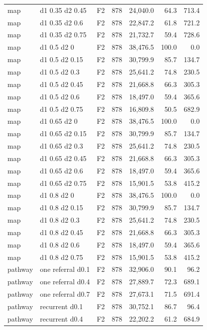 \begin{longtable}{p{1.8cm}p{3.35cm}lrrrr}
map & d1 0.35 d2 0.45 & F2 & 878 & 24,040.0 & 64.3 & 713.4\\
map & d1 0.35 d2 0.6 & F2 & 878 & 22,847.2 & 61.8 & 721.2\\
map & d1 0.35 d2 0.75 & F2 & 878 & 21,732.7 & 59.4 & 728.6\\
map & d1 0.5 d2 0 & F2 & 878 & 38,476.5 & 100.0 & 0.0\\
map & d1 0.5 d2 0.15 & F2 & 878 & 30,799.9 & 85.7 & 134.7\\
map & d1 0.5 d2 0.3 & F2 & 878 & 25,641.2 & 74.8 & 230.5\\
map & d1 0.5 d2 0.45 & F2 & 878 & 21,668.8 & 66.3 & 305.3\\
map & d1 0.5 d2 0.6 & F2 & 878 & 18,497.0 & 59.4 & 365.6\\
map & d1 0.5 d2 0.75 & F2 & 878 & 16,809.8 & 50.5 & 682.9\\
map & d1 0.65 d2 0 & F2 & 878 & 38,476.5 & 100.0 & 0.0\\
map & d1 0.65 d2 0.15 & F2 & 878 & 30,799.9 & 85.7 & 134.7\\
map & d1 0.65 d2 0.3 & F2 & 878 & 25,641.2 & 74.8 & 230.5\\
map & d1 0.65 d2 0.45 & F2 & 878 & 21,668.8 & 66.3 & 305.3\\
map & d1 0.65 d2 0.6 & F2 & 878 & 18,497.0 & 59.4 & 365.6\\
map & d1 0.65 d2 0.75 & F2 & 878 & 15,901.5 & 53.8 & 415.2\\
map & d1 0.8 d2 0 & F2 & 878 & 38,476.5 & 100.0 & 0.0\\
map & d1 0.8 d2 0.15 & F2 & 878 & 30,799.9 & 85.7 & 134.7\\
map & d1 0.8 d2 0.3 & F2 & 878 & 25,641.2 & 74.8 & 230.5\\
map & d1 0.8 d2 0.45 & F2 & 878 & 21,668.8 & 66.3 & 305.3\\
map & d1 0.8 d2 0.6 & F2 & 878 & 18,497.0 & 59.4 & 365.6\\
map & d1 0.8 d2 0.75 & F2 & 878 & 15,901.5 & 53.8 & 415.2\\
pathway & one referral d0.1 & F2 & 878 & 32,906.0 & 90.1 & 96.2\\
pathway & one referral d0.4 & F2 & 878 & 27,889.7 & 72.3 & 689.1\\
pathway & one referral d0.7 & F2 & 878 & 27,673.1 & 71.5 & 691.4\\
pathway & recurrent d0.1 & F2 & 878 & 30,752.1 & 86.7 & 96.4\\
pathway & recurrent d0.4 & F2 & 878 & 22,202.2 & 61.2 & 684.9\\

\end{longtable}
